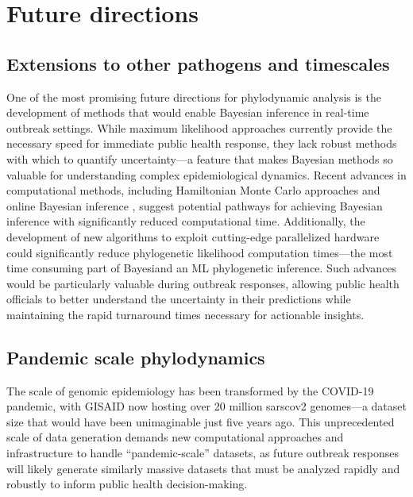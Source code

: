 \section{Future directions}
\subsection{Extensions to other pathogens and timescales}
One of the most promising future directions for phylodynamic analysis is the development of methods that would enable Bayesian inference in real-time outbreak settings.
While maximum likelihood approaches currently provide the necessary speed for immediate public health response, they lack robust methods with which to quantify uncertainty---a feature that makes Bayesian methods so valuable for understanding complex epidemiological dynamics.
Recent advances in computational methods, including Hamiltonian Monte Carlo approaches \citep{baele2020hamiltonian,ji2023scalable} and online Bayesian inference \citep{gill2020online,dinh2018online}, suggest potential pathways for achieving Bayesian inference with significantly reduced computational time.
Additionally, the development of new algorithms to exploit cutting-edge parallelized hardware could significantly reduce phylogenetic likelihood computation times---the most time consuming part of Bayesiand an ML phylogenetic inference.
Such advances would be particularly valuable during outbreak responses, allowing public health officials to better understand the uncertainty in their predictions while maintaining the rapid turnaround times necessary for actionable insights.

\subsection{Pandemic scale phylodynamics}
The scale of genomic epidemiology has been transformed by the COVID-19 pandemic, with GISAID now hosting over 20 million \gls{sarscov2} genomes---a dataset size that would have been unimaginable just five years ago.
This unprecedented scale of data generation demands new computational approaches and infrastructure to handle ``pandemic-scale'' datasets, as future outbreak responses will likely generate similarly massive datasets that must be analyzed rapidly and robustly to inform public health decision-making.

